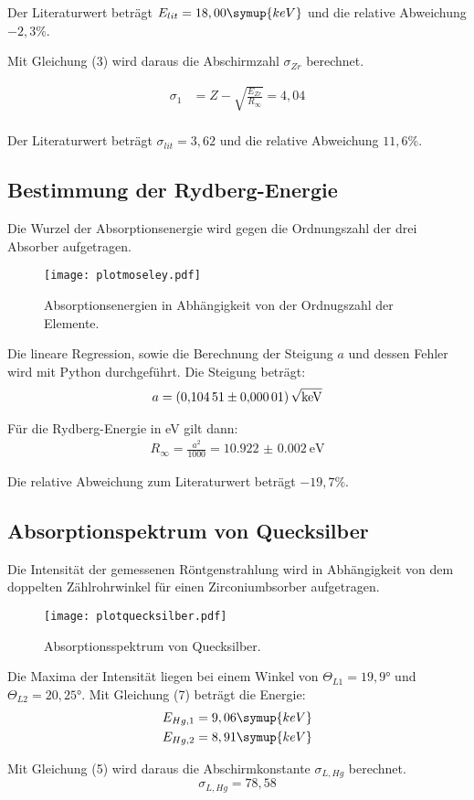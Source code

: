 Der Literaturwert beträgt $E_{lit} = 18,00 \symup{keV}$ und die relative Abweichung $-2,3\%$.

Mit Gleichung (3) wird daraus die Abschirmzahl $\sigma_{Zr}$  berechnet.

\begin{align*}
  \sigma_1 &= Z - \sqrt{\frac{E_{Zr}}{R_{\infty}}} = 4,04 \\
\end{align*}

Der Literaturwert beträgt $\sigma_{lit} = 3,62$ und die relative Abweichung $11,6\%$.


\subsection{Bestimmung der Rydberg-Energie}

Die Wurzel der Absorptionsenergie wird gegen die Ordnungszahl der drei Absorber aufgetragen.

\begin{figure}[H]
  \centering
  \texttt{[image: plotmoseley.pdf]}
  \caption{Absorptionsenergien in Abhängigkeit von der Ordnugszahl der Elemente.}
  \label{fig:plot}
\end{figure}

Die lineare Regression, sowie die Berechnung der Steigung $a$ und dessen Fehler wird mit Python durchgeführt.
Die Steigung beträgt:
\begin{align*}
  a = \SI{0.10451(1)}{\sqrt{\kilo\eV}}
\end{align*}

Für die Rydberg-Energie in eV gilt dann:
\begin{align*}
  R_{\infty} = \frac{a^2}{1000} =\SI{10.922(2)}{\eV}
\end{align*}

Die relative Abweichung zum Literaturwert beträgt $-19,7 \%$.


\subsection{Absorptionspektrum von Quecksilber}

Die Intensität der gemessenen Röntgenstrahlung wird in Abhängigkeit von dem doppelten Zählrohrwinkel für
einen Zirconiumbsorber aufgetragen.

\begin{figure}[H]
  \centering
  \texttt{[image: plotquecksilber.pdf]}
  \caption{Absorptionsspektrum von Quecksilber.}
  \label{fig:plot}
\end{figure}


Die Maxima der Intensität liegen bei einem Winkel von $\Theta_{L1} = 19,9°$  und $\Theta_{L2} = 20,25°$.
Mit Gleichung (7) beträgt die Energie:
\begin{align*}
  E_{Hg,1} = 9,06 \symup{keV} \\
  E_{Hg,2} = 8,91 \symup{keV}
\end{align*}

Mit Gleichung (5) wird daraus die Abschirmkonstante $\sigma_{L, Hg}$ berechnet.
\begin{equation*}
  \sigma_{L, Hg} = 78,58
\end{equation*}
